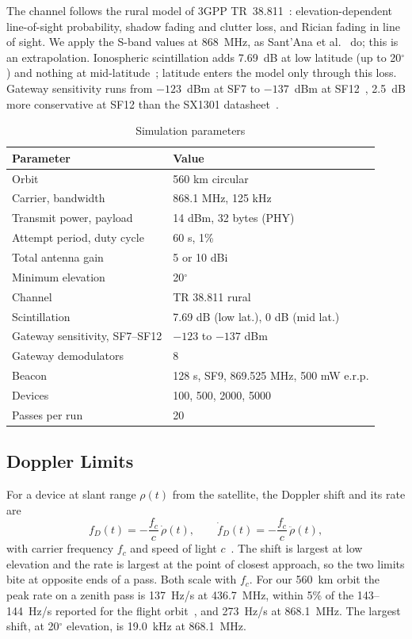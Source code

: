 \documentclass[journal]{IEEEtran}
\begin{document}
The channel follows the rural model of 3GPP TR~38.811~\cite{tr38811}: elevation-dependent line-of-sight probability, shadow fading and clutter loss, and Rician fading in line of sight. We apply the S-band values at 868~MHz, as Sant'Ana et al.~\cite{santana2026} do; this is an extrapolation. Ionospheric scintillation adds 7.69~dB at low latitude (up to 20$^\circ$) and nothing at mid-latitude~\cite{tr38811}; latitude enters the model only through this loss. Gateway sensitivity runs from $-123$~dBm at SF7 to $-137$~dBm at SF12~\cite{santana2026,herreria2023}, 2.5~dB more conservative at SF12 than the SX1301 datasheet~\cite{sx1301}.

\begin{table}[t]
\centering
\caption{Simulation parameters}\label{tab:params}
\begin{tabular}{@{}ll@{}}
\toprule
Parameter & Value \\
\midrule
Orbit & 560 km circular \\
Carrier, bandwidth & 868.1 MHz, 125 kHz \\
Transmit power, payload & 14 dBm, 32 bytes (PHY) \\
Attempt period, duty cycle & 60 s, 1\% \\
Total antenna gain & 5 or 10 dBi \\
Minimum elevation & 20$^\circ$ \\
Channel & TR 38.811 rural \\
Scintillation & 7.69 dB (low lat.), 0 dB (mid lat.) \\
Gateway sensitivity, SF7--SF12 & $-123$ to $-137$ dBm \\
Gateway demodulators & 8 \\
Beacon & 128 s, SF9, 869.525 MHz, 500 mW e.r.p. \\
Devices & 100, 500, 2000, 5000 \\
Passes per run & 20 \\
\bottomrule
\end{tabular}
\end{table}

\subsection{Doppler Limits}
For a device at slant range $\rho(t)$ from the satellite, the Doppler shift and its rate are
\begin{equation}\label{eq:doppler}
f_D(t)=-\frac{f_c}{c}\,\dot\rho(t),\qquad \dot f_D(t)=-\frac{f_c}{c}\,\ddot\rho(t),
\end{equation}
with carrier frequency $f_c$ and speed of light $c$~\cite{asadullah2024}. The shift is largest at low elevation and the rate is largest at the point of closest approach, so the two limits bite at opposite ends of a pass. Both scale with $f_c$. For our 560~km orbit the peak rate on a zenith pass is 137~Hz/s at 436.7~MHz, within 5\% of the 143--144~Hz/s reported for the flight orbit~\cite{zadorozhny2022,asadullah2024}, and 273~Hz/s at 868.1~MHz. The largest shift, at 20$^\circ$ elevation, is 19.0~kHz at 868.1~MHz.
\end{document}
